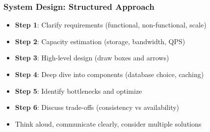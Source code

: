 




\begin{frame}[fragile]\frametitle{System Design: Structured Approach}

      \begin{itemize}
		\item \textbf{Step 1}: Clarify requirements (functional, non-functional, scale)
		\item \textbf{Step 2}: Capacity estimation (storage, bandwidth, QPS)
		\item \textbf{Step 3}: High-level design (draw boxes and arrows)
		\item \textbf{Step 4}: Deep dive into components (database choice, caching)
		\item \textbf{Step 5}: Identify bottlenecks and optimize
		\item \textbf{Step 6}: Discuss trade-offs (consistency vs availability)
		\item Think aloud, communicate clearly, consider multiple solutions
	  \end{itemize}

\end{frame}

